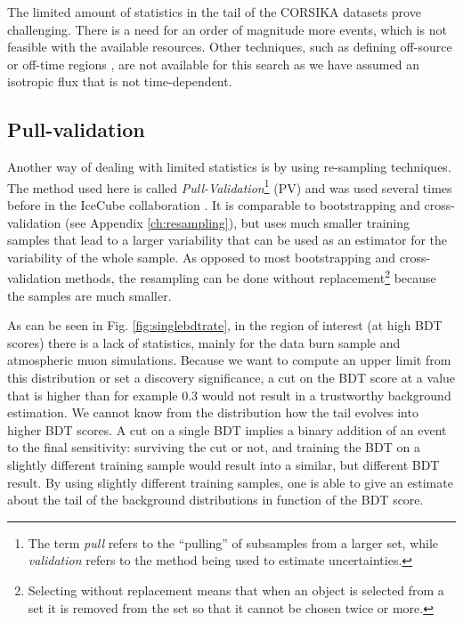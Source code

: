 \noindent The limited amount of statistics in the tail of the CORSIKA datasets prove challenging. There is a need for an order of magnitude more events, which is not feasible with the available resources. Other techniques, such as defining off-source or off-time regions \cite{1352676}, are not available for this search as we have assumed an isotropic flux that is not time-dependent.



\subsection{Pull-validation}
\label{subsec:pv}
Another way of dealing with limited statistics is by using re-sampling techniques. The method used here is called \textit{Pull-Validation}\footnote{The term \textit{pull} refers to the ``pulling'' of subsamples from a larger set, while \textit{validation} refers to the method being used to estimate uncertainties.} (PV) and was used several times before in the IceCube collaboration \cite{Aartsen:2016fep,Aartsen:2015exf,scheriauthesis}. It is comparable to bootstrapping and cross-validation (see Appendix \ref{ch:resampling}), but uses much smaller training samples that lead to a larger variability that can be used as an estimator for the variability of the whole sample. As opposed to most bootstrapping and cross-validation methods, the resampling can be done without replacement\footnote{Selecting without replacement means that when an object is selected from a set it is removed from the set so that it cannot be chosen twice or more.} because the samples are much smaller.

As can be seen in Fig. \ref{fig:singlebdtrate}, in the region of interest (at high BDT scores) there is a lack of statistics, mainly for the data burn sample and atmospheric muon simulations. Because we want to compute an upper limit from this distribution or set a discovery significance, a cut on the BDT score at a value that is higher than for example 0.3 would not result in a trustworthy background estimation. We cannot know from the distribution how the tail evolves into higher BDT scores. A cut on a single BDT implies a binary addition of an event to the final sensitivity: surviving the cut or not, and training the BDT on a slightly different training sample would result into a similar, but different BDT result. By using slightly different training samples, one is able to give an estimate about the tail of the background distributions in function of the BDT score.\\

